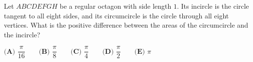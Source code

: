 Let $ABCDEFGH$ be a regular octagon with side length $1$. Its incircle is the circle tangent to all eight sides, and its circumcircle is the circle through all eight vertices. What is the positive difference between the areas of the circumcircle and the incircle?

$\textbf{(A) }\dfrac{\pi}{16}\qquad\textbf{(B) }\dfrac{\pi}{8}\qquad\textbf{(C) }\dfrac{\pi}{4}\qquad\textbf{(D) }\dfrac{\pi}{2}\qquad\textbf{(E) }\pi$
